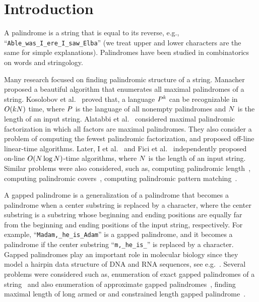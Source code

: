 \section{Introduction}
A palindrome is a string that is equal to its reverse, e.g., ``\texttt{Able_was_I_ere_I_saw_Elba}'' (we treat upper and lower characters are the same for simple explanations).
Palindromes have been studied in combinatorics on words and stringology.

Many research focused on finding palindromic structure of a string.
Manacher~\cite{Manacher75} proposed a beautiful algorithm that enumerates all maximal palindromes of a string.
Kosolobov et al.~\cite{KosolobovRS15} proved that, a language $P^k$ can be recognizable in $O(k N)$ time, where $P$ is the language of all nonempty palindromes and $N$ is the length of an input string.
Alatabbi et al.~\cite{Alatabbi13} considered maximal palindromic factorization in which all factors are maximal palindromes.
They also consider a problem of computing the fewest palindromic factorization, and proposed off-line linear-time algorithms.
Later, I et al.~\cite{ISIBT14} and Fici et al.~\cite{FiciGKK14} independently proposed on-line $O(N \log N)$-time algorithms, where $N$ is the length of an input string.
Similar problems were also considered, such as, computing palindromic length~\cite{BorozdinKRS17}, computing palindromic covers~\cite{ISIBT14}, computing palindromic pattern matching~\cite{I2013}.

A gapped palindrome is a generalization of a palindrome that becomes a palindrome when a center substring is replaced by a character, where the center substring is a substring whose beginning and ending positions are equally far from the beginning and ending positions of the input string, respectively.
For example, ``\texttt{Madam,_he_is_Adam}'' is a gapped palindrome, and it becomes a palindrome if the center substring ``\texttt{m,_he_is_}'' is replaced by a character.
Gapped palindromes play an important role in molecular biology since they model a hairpin data structure of DNA and RNA sequences, see e.g.~\cite{Gerald08}.
Several problems were considered such as, enumeration of exact gapped palindromes of a string~\cite{KolpakovK09} and also enumeration of approximate gapped palindromes~\cite{NarisadaDNIS17,HsuCC10}, finding maximal length of long armed or and constrained length gapped palindrome~\cite{Gupta2016}.

